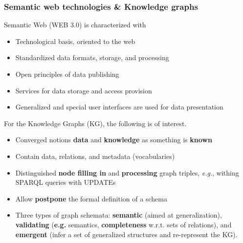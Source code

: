 \documentclass[10pt]{beamer}
\begin{document}
\begin{frame}[fragile]
  \frametitle{Semantic web technologies \& Knowledge graphs}
  Semantic Web (WEB 3.0) is characterized with
  \begin{itemize}
  \item Technological basis, oriented to the web %
  \item Standardized data formats, storage, and processing
  \item Open principles of data publishing
  \item Services for data storage and access provision
  \item Generalized and special user interfaces are used for data presentation\vspace{1em}
  \end{itemize}


For the Knowledge Graphs (KG), the following is of interest.
 \begin{itemize}
  \item Converged notions \textbf{data} and \textbf{knowledge} as something is \textbf{known}
  \item Contain data, relations, and metadata (vocabularies)
  \item Distinguished \textbf{node filling in} and \textbf{processing} graph triples, \emph{e.g.}, withing SPARQL queries with UPDATEs
  \item Allow \textbf{postpone} the formal definition of a schema
  \item Three types of graph schemata: \textbf{semantic} (aimed at generalization), \textbf{validating} (\textbf{e.g.} semantics, \textbf{completeness} w.r.t. sets of relations), and \textbf{emergent} (infer a set of generalized structures and re-represent the KG).
  \end{itemize}
\end{frame}


\def\textbfr#1{\textbf{{\color{red}#1*}}}
\end{document}
